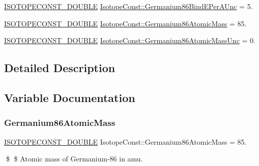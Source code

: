 \begin{DoxyCompactItemize}
\mbox{\hyperlink{group___isotope_const-_macros_ga8f45a7272ce02c0b4c65c44636ed719a}{I\+S\+O\+T\+O\+P\+E\+C\+O\+N\+S\+T\+\_\+\+D\+O\+U\+B\+LE}} \mbox{\hyperlink{group___isotope_const-_germanium-_ge86_ga16889bdb1eb63df9af2854cd5611d4b5}{Isotope\+Const\+::\+Germanium86\+Bind\+E\+Per\+A\+Unc}} = 5.
\item 
\mbox{\hyperlink{group___isotope_const-_macros_ga8f45a7272ce02c0b4c65c44636ed719a}{I\+S\+O\+T\+O\+P\+E\+C\+O\+N\+S\+T\+\_\+\+D\+O\+U\+B\+LE}} \mbox{\hyperlink{group___isotope_const-_germanium-_ge86_gabf4493966b7dee27a675c3a8c2868723}{Isotope\+Const\+::\+Germanium86\+Atomic\+Mass}} = 85.
\item 
\mbox{\hyperlink{group___isotope_const-_macros_ga8f45a7272ce02c0b4c65c44636ed719a}{I\+S\+O\+T\+O\+P\+E\+C\+O\+N\+S\+T\+\_\+\+D\+O\+U\+B\+LE}} \mbox{\hyperlink{group___isotope_const-_germanium-_ge86_gafd4651714f8e32a482a629baf492f971}{Isotope\+Const\+::\+Germanium86\+Atomic\+Mass\+Unc}} = 0.
\end{DoxyCompactItemize}


\subsection{Detailed Description}


\subsection{Variable Documentation}
\mbox{\label{group___isotope_const-_germanium-_ge86_gabf4493966b7dee27a675c3a8c2868723}} 
\subsubsection{\texorpdfstring{Germanium86\+Atomic\+Mass}{Germanium86AtomicMass}}
{\footnotesize\ttfamily \mbox{\hyperlink{group___isotope_const-_macros_ga8f45a7272ce02c0b4c65c44636ed719a}{I\+S\+O\+T\+O\+P\+E\+C\+O\+N\+S\+T\+\_\+\+D\+O\+U\+B\+LE}} Isotope\+Const\+::\+Germanium86\+Atomic\+Mass = 85.}

\$ \$ Atomic mass of Germanium-\/86 in amu. \mbox{\label{group___isotope_const-_germanium-_ge86_gafd4651714f8e32a482a629baf492f971}} 
